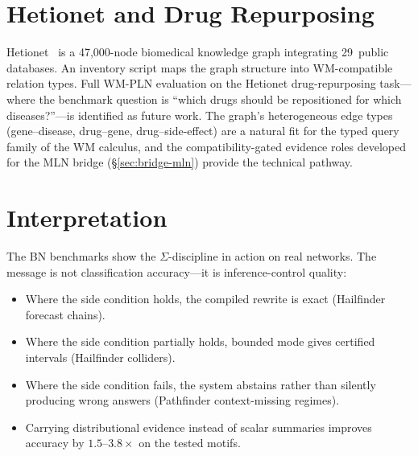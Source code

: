 \documentclass[11pt,openany]{report}
\begin{document}
\section{Hetionet and Drug Repurposing}

Hetionet~\cite{Himmelstein2017Rephetio} is a 47,000-node
biomedical knowledge graph integrating 29~public databases.
An inventory script maps the graph structure into WM-compatible
relation types.  Full WM-PLN evaluation on the Hetionet
drug-repurposing task---where the benchmark question is
``which drugs should be repositioned for which diseases?''---is
identified as future work.  The graph's heterogeneous edge types
(gene--disease, drug--gene, drug--side-effect) are a natural fit
for the typed query family of the WM calculus, and the
compatibility-gated evidence roles developed for the MLN bridge
(\S\ref{sec:bridge-mln}) provide the technical pathway.


\section{Interpretation}

The BN benchmarks show the $\Sigma$-discipline in action on real
networks.  The message is not classification accuracy---it is
inference-control quality:
\begin{itemize}
\item Where the side condition holds, the compiled rewrite is
  exact (Hailfinder forecast chains).
\item Where the side condition partially holds, bounded mode
  gives certified intervals (Hailfinder colliders).
\item Where the side condition fails, the system abstains rather
  than silently producing wrong answers (Pathfinder
  context-missing regimes).
\item Carrying distributional evidence instead of scalar summaries
  improves accuracy by $1.5$--$3.8\times$ on the tested motifs.
\end{itemize}

\end{document}
